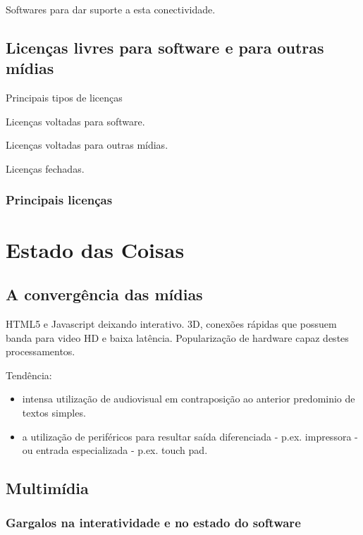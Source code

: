 Softwares para dar suporte a esta conectividade.

\subsection{Licenças livres para software e para outras mídias}
\label{sec:licencas_livres}

Principais tipos de licenças

Licenças voltadas para software.

Licenças voltadas para outras mídias.

Licenças fechadas.

\subsubsection{Principais licenças}
\label{sec:princ_licencas}



\section{Estado das Coisas}
\label{sec:context}


\subsection{A convergência das mídias}
\label{sec:midiamultimidia}

HTML5 e Javascript deixando interativo. 3D, conexões rápidas que possuem banda para video HD e
baixa latência. Popularização de hardware capaz destes processamentos.

Tendência: 
\begin{itemize}
    \item intensa utilização de audiovisual em contraposição ao
anterior predominio de textos simples.
    \item a utilização de periféricos para resultar saída diferenciada - p.ex.
impressora - ou entrada especializada - p.ex. touch pad.
\end{itemize}


\subsection{Multimídia}

\subsubsection{Gargalos na interatividade e no estado do software}
\label{sec:gargalos}

